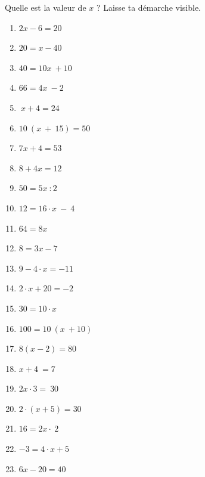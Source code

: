 \documentclass[../../syllabus_1.tex]{subfiles}
\begin{document}
\begin{exercise}
    Quelle est la valeur de \(x\) ? Laisse ta démarche visible.
    \begin{enumerate}[cols=3]
        \item \(2x - 6 = 20\)
        \item \(20=x - 40\)
        \item \(40=10x\  + 10\) 
        \item \(66=4x\  - 2\)
        \item \(\ x + 4 = 24\)
        \item \(10\ (x\  + \ 15) = 50\)
        \item \(7x + 4 = 53\)
        \item \(8 + 4x = 12\)
        \item \(50=5x\ : 2\)
        \item \(12= 16\cdot x\  - \ 4\)
        \item \(64=8x \)
        \item \(8=3x - 7\)
        \item \(9 - 4 \cdot x = - 11\)
        \item \(2 \cdot x + 20 = - 2\)
        \item \(30=10 \cdot x\)
        \item \(100=10\ (x\  + 10)\)
        \item \(8(x - 2) = 80\)
        \item \(x + 4\  = 7\)
        \item \(2x \cdot 3 = \ 30\)
        \item \(2\cdot (x+5) = 30\)
        \item \(16=2x \cdot \ 2\)
        \item \(-3=4 \cdot x + 5\)
        \item \(6x-20=40\)
    \end{enumerate}
\end{exercise}
\end{document}
